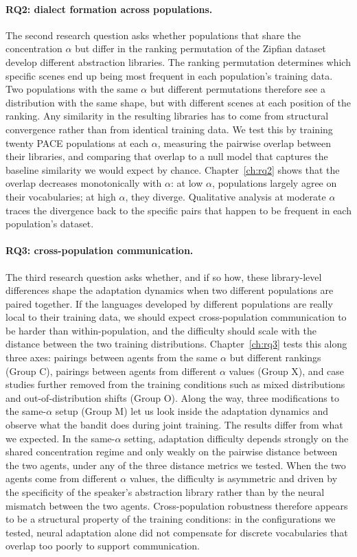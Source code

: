 \paragraph{RQ2: dialect formation across populations.}
The second research question asks whether populations that share the concentration $\alpha$ but differ in the ranking permutation of the Zipfian dataset develop different abstraction libraries. The ranking permutation determines which specific scenes end up being most frequent in each population's training data. Two populations with the same $\alpha$ but different permutations therefore see a distribution with the same shape, but with different scenes at each position of the ranking. Any similarity in the resulting libraries has to come from structural convergence rather than from identical training data. We test this by training twenty PACE populations at each $\alpha$, measuring the pairwise overlap between their libraries, and comparing that overlap to a null model that captures the baseline similarity we would expect by chance. Chapter~\ref{ch:rq2} shows that the overlap decreases monotonically with $\alpha$: at low $\alpha$, populations largely agree on their vocabularies; at high $\alpha$, they diverge. Qualitative analysis at moderate $\alpha$ traces the divergence back to the specific pairs that happen to be frequent in each population's dataset.

\paragraph{RQ3: cross-population communication.}
The third research question asks whether, and if so how, these library-level differences shape the adaptation dynamics when two different populations are paired together. If the languages developed by different populations are really local to their training data, we should expect cross-population communication to be harder than within-population, and the difficulty should scale with the distance between the two training distributions. Chapter~\ref{ch:rq3} tests this along three axes: pairings between agents from the same $\alpha$ but different rankings (Group C), pairings between agents from different $\alpha$ values (Group X), and case studies further removed from the training conditions such as mixed distributions and out-of-distribution shifts (Group O). Along the way, three modifications to the same-$\alpha$ setup (Group M) let us look inside the adaptation dynamics and observe what the bandit does during joint training. The results differ from what we expected. In the same-$\alpha$ setting, adaptation difficulty depends strongly on the shared concentration regime and only weakly on the pairwise distance between the two agents, under any of the three distance metrics we tested. When the two agents come from different $\alpha$ values, the difficulty is asymmetric and driven by the specificity of the speaker's abstraction library rather than by the neural mismatch between the two agents. Cross-population robustness therefore appears to be a structural property of the training conditions: in the configurations we tested, neural adaptation alone did not compensate for discrete vocabularies that overlap too poorly to support communication.

